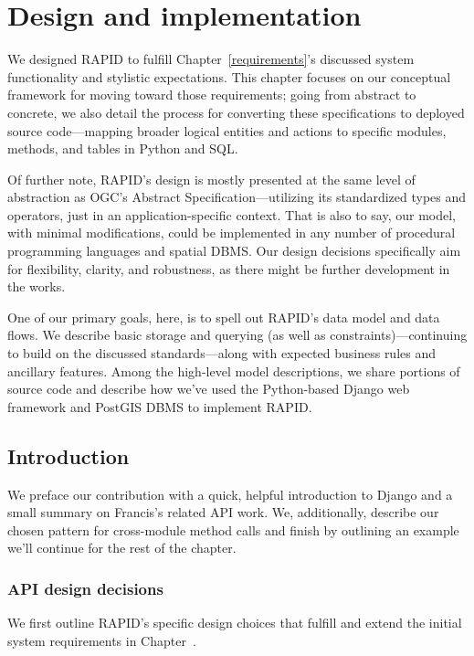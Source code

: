 \chapter{Design and implementation}
\label{design}

We designed RAPID to fulfill Chapter~\ref{requirements}'s discussed system functionality and stylistic expectations. This chapter focuses on our conceptual framework for moving toward those requirements; going from abstract to concrete, we also detail the process for converting these specifications to deployed source code---mapping broader logical entities and actions to specific modules, methods, and tables in Python and SQL.

Of further note, RAPID's design is mostly presented at the same level of abstraction as OGC's Abstract Specification---utilizing its standardized types and operators, just in an application-specific context. That is also to say, our model, with minimal modifications, could be implemented in any number of procedural programming languages and spatial DBMS. Our design decisions specifically aim for flexibility, clarity, and robustness, as there might be further development in the works.

One of our primary goals, here, is to spell out RAPID's data model and data flows. We describe basic storage and querying (as well as constraints)---continuing to build on the discussed standards---along with expected business rules and ancillary features. Among the high-level model descriptions, we share portions of source code and describe how we've used the Python-based Django web framework and PostGIS DBMS to implement RAPID.





\section{Introduction}
We preface our contribution with a quick, helpful introduction to Django and a small summary on Francis's related API work. We, additionally, describe our chosen pattern for cross-module method calls and finish by outlining an example we'll continue for the rest of the chapter.

\subsection{API design decisions}
We first outline RAPID's specific design choices that fulfill and extend the initial system requirements in Chapter~\cite{Requirements}.

